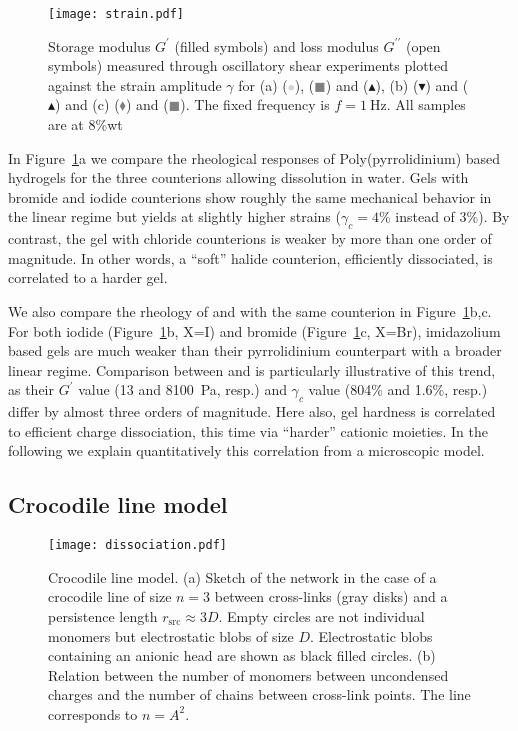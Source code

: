 \documentclass[journal=jacsat,manuscript=article]{achemso}
\begin{document}
\begin{figure}
\texttt{[image: strain.pdf]}
\caption{Storage modulus $G^\prime$ (filled symbols) and loss modulus $G^{\prime\prime}$ (open symbols) measured through oscillatory shear experiments plotted against the strain amplitude $\gamma$ for (a)  (\textcolor{lightgray}{$\bullet$}),  (\textcolor{gray}{$\blacksquare$}) and  ($\blacktriangle$), (b)  ($\blacktriangledown$) and  ($\blacktriangle$) and (c)  (\textcolor{gray}{$\blacklozenge$}) and  (\textcolor{gray}{$\blacksquare$}). The fixed frequency is $f=\SI{1}{\hertz}$. All samples are at 8\%wt }
\label{fig:strain}
\end{figure}

In Figure~\ref{fig:strain}a we compare the rheological responses of Poly(pyrrolidinium) based hydrogels for the three counterions allowing dissolution in water. Gels with bromide and iodide counterions show roughly the same mechanical behavior in the linear regime but  yields at slightly higher strains ($\gamma_c=4\%$ instead of $3\%$). By contrast, the gel with chloride counterions is weaker by more than one order of magnitude. In other words, a ``soft'' halide counterion, efficiently dissociated, is correlated to a harder gel.

We also compare the rheology of  and  with the same counterion  in Figure~\ref{fig:strain}b,c. For both iodide (Figure~\ref{fig:strain}b, X=I) and bromide (Figure~\ref{fig:strain}c, X=Br), imidazolium based gels are much weaker than their pyrrolidinium counterpart with a broader linear regime. Comparison between  and  is particularly illustrative of this trend, as their $G^\prime$ value (13 and \SI{8100}{\pascal}, resp.) and $\gamma_c$ value (804\% and 1.6\%, resp.) differ by almost three orders of magnitude. Here also, gel hardness is correlated to efficient charge dissociation, this time via ``harder'' cationic moieties. In the following we explain quantitatively this correlation from a microscopic model.



\subsection{Crocodile line model}

\begin{figure}
\texttt{[image: dissociation.pdf]}
\caption{Crocodile line model. (a) Sketch of the network in the case of a crocodile line of size $n=3$ between cross-links (gray disks) and a persistence length $r_\mathrm{src}\approx 3D$. Empty circles are not individual monomers but electrostatic blobs of size $D$. Electrostatic blobs containing an anionic head are shown as black filled circles. (b) Relation between the number of monomers between uncondensed charges and the number of chains between cross-link points. The line corresponds to $n = A^2$.}
\label{fig:dissociation}
\end{figure}
\end{document}
